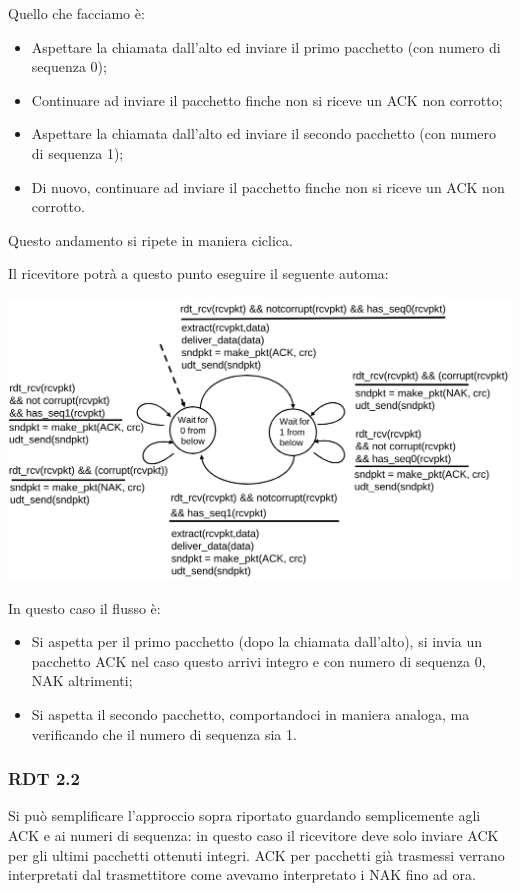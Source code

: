 \documentclass[a4paper,11pt]{article}
\begin{document}
Quello che facciamo è:
\begin{itemize}
	\item Aspettare la chiamata dall'alto ed inviare il primo pacchetto (con numero di sequenza 0);
	\item Continuare ad inviare il pacchetto finche non si riceve un ACK non corrotto;
	\item Aspettare la chiamata dall'alto ed inviare il secondo pacchetto (con numero di sequenza 1);
	\item Di nuovo, continuare ad inviare il pacchetto finche non si riceve un ACK non corrotto.
\end{itemize}

Questo andamento si ripete in maniera ciclica.

\newpage

Il ricevitore potrà a questo punto eseguire il seguente automa:
\begin{center}
	\includegraphics[scale=0.25]{../figures/rdt21fsm2.png}
\end{center}

In questo caso il flusso è:
\begin{itemize}
	\item Si aspetta per il primo pacchetto (dopo la chiamata dall'alto), si invia un pacchetto ACK nel caso questo arrivi integro e con numero di sequenza 0, NAK altrimenti;
	\item Si aspetta il secondo pacchetto, comportandoci in maniera analoga, ma verificando che il numero di sequenza sia 1.
\end{itemize}

\subsubsection{RDT 2.2}
Si può semplificare l'approccio sopra riportato guardando semplicemente agli ACK e ai numeri di sequenza: in questo caso il ricevitore deve solo inviare ACK per gli ultimi pacchetti ottenuti integri.
ACK per pacchetti già trasmessi verrano interpretati dal trasmettitore come avevamo interpretato i NAK fino ad ora.
\end{document}
